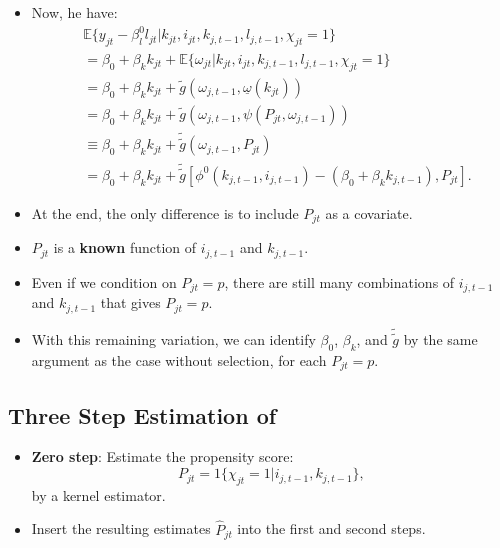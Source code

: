 \documentclass[
]{book}
\providecommand{\tightlist}{%
  \setlength{\itemsep}{0pt}\setlength{\parskip}{0pt}}
\begin{document}
\begin{itemize}
\tightlist
\item
  Now, he have:
  \begin{equation}
  \begin{split}
  &\mathbb{E}\{y_{jt} - \beta_l^0 l_{jt}|k_{jt}, i_{jt}, k_{j, t - 1}, l_{j, t - 1}, \chi_{jt} = 1\} \\
  &= \beta_0 + \beta_k k_{jt} + \mathbb{E}\{\omega_{jt}| k_{jt}, i_{jt}, k_{j, t - 1}, l_{j, t - 1} , \chi_{jt} = 1\}\\
  &= \beta_0 + \beta_k k_{jt} + \tilde{g}(\omega_{j, t - 1}, \underline{\omega}(k_{jt}))\\
  &= \beta_0 + \beta_k k_{jt} + \tilde{g}(\omega_{j, t - 1}, \psi(P_{jt}, \omega_{j, t - 1}))\\
  &\equiv \beta_0 + \beta_k k_{jt} + \tilde{\tilde{g}}(\omega_{j, t - 1}, P_{jt})\\
  &= \beta_0 + \beta_k k_{jt} + \tilde{\tilde{g}}[\phi^0(k_{j, t - 1}, i_{j, t - 1}) - (\beta_0 + \beta_k k_{j, t - 1}), P_{jt}].
  \end{split}
  \end{equation}
\item
  At the end, the only difference is to include \(P_{jt}\) as a covariate.
\item
  \(P_{jt}\) is a \textbf{known} function of \(i_{j, t - 1}\) and \(k_{j, t - 1}\).
\item
  Even if we condition on \(P_{jt} = p\), there are still many combinations of \(i_{j, t - 1}\) and \(k_{j, t - 1}\) that gives \(P_{jt} = p\).
\item
  With this remaining variation, we can identify \(\beta_0\), \(\beta_k\), and \(\tilde{\tilde{g}}\) by the same argument as the case without selection, for each \(P_{jt} = p\).
\end{itemize}

\hypertarget{three-step-estimation-of-olley1996}{%
\subsection{\texorpdfstring{Three Step Estimation of \citet{Olley1996}}{Three Step Estimation of @Olley1996}}\label{three-step-estimation-of-olley1996}}

\begin{itemize}
\tightlist
\item
  \textbf{Zero step}: Estimate the propensity score:
  \begin{equation}
  P_{jt} = 1\{\chi_{jt} = 1| i_{j, t - 1}, k_{j, t - 1}\},
  \end{equation}
  by a kernel estimator.
\item
  Insert the resulting estimates \(\widehat{P}_{jt}\) into the first and second steps.
\end{itemize}
\end{document}
